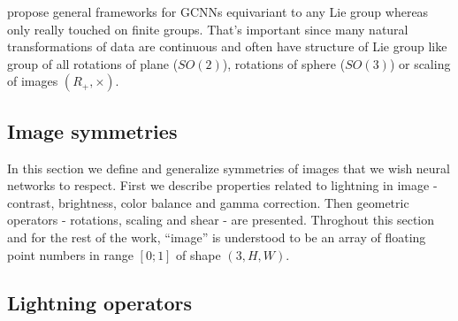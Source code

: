     \cite{bekkers2019, lieconv} propose general frameworks for
    GCNNs equivariant to any Lie group whereas \cite{cohen2016} only really
    touched on finite groups. That's important since many natural
    transformations of data are continuous and often have structure of Lie group
    like group of all rotations of plane ($SO(2)$), rotations of sphere
    ($SO(3)$) or scaling of images $(R_+, \times)$.


\subsection{Image symmetries}
    \label{sec:transformations}
    In this section we define and generalize symmetries of images that we wish
    neural networks to respect. First we describe
    properties related to lightning in image - contrast,
    brightness, color balance and gamma correction. Then geometric operators -
    rotations, scaling and shear - are presented.
    Throghout this section and for the rest of the work,
    ``image'' is understood to be an array of
    floating point numbers in range $\left[0;1\right]$ of shape $\left(3, H,
    W\right)$.
    \subsection{Lightning operators}
